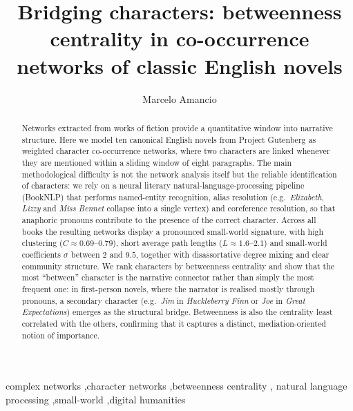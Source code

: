 \documentclass[preprint,12pt]{elsarticle}
\begin{document}
\begin{frontmatter}

\title{Bridging characters: betweenness centrality in co-occurrence networks
of classic English novels}

\author[a]{Marcelo Amancio}



\begin{abstract}
Networks extracted from works of fiction provide a quantitative window into
narrative structure. Here we model ten canonical English novels from Project
Gutenberg as weighted character co-occurrence networks, where two characters are
linked whenever they are mentioned within a sliding window of eight paragraphs.
The main methodological difficulty is not the network analysis itself but the
reliable identification of characters: we rely on a neural literary
natural-language-processing pipeline (BookNLP) that performs named-entity
recognition, alias resolution (e.g.\ \emph{Elizabeth}, \emph{Lizzy} and
\emph{Miss Bennet} collapse into a single vertex) and coreference resolution,
so that anaphoric pronouns contribute to the presence of the correct character.
Across all books the resulting networks display a pronounced small-world
signature, with high clustering ($C\!\approx\!0.69$--$0.79$), short average path
lengths ($L\!\approx\!1.6$--$2.1$) and small-world coefficients $\sigma$ between
$2$ and $9.5$, together with disassortative degree mixing and clear community
structure. We rank characters by betweenness centrality and show that the most
``between'' character is the narrative connector rather than simply the most
frequent one: in first-person novels, where the narrator is realised mostly
through pronouns, a secondary character (e.g.\ \emph{Jim} in \emph{Huckleberry
Finn} or \emph{Joe} in \emph{Great Expectations}) emerges as the structural
bridge. Betweenness is also the centrality least correlated with the others,
confirming that it captures a distinct, mediation-oriented notion of importance.
\end{abstract}

\begin{keyword}
complex networks \sep character networks \sep betweenness centrality \sep
natural language processing \sep small-world \sep digital humanities
\end{keyword}

\end{frontmatter}
\end{document}
